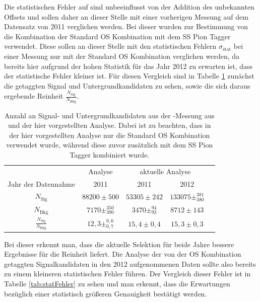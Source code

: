 Die statistischen Fehler auf \dmd sind unbeeinflusst von der Addition des unbekannten Offsets und sollen daher an dieser Stelle mit einer vorherigen Messung  auf dem Datensatz von \num{2011} \cite{dmd_messung} verglichen werden. Bei dieser wurden zur Bestimmung von \dmd die Kombination der Standard OS Kombination mit dem SS Pion Tagger verwendet. Diese sollen an dieser Stelle mit den statistischen Fehlern $\sigma_\text{stat}$ bei einer Messung nur mit der Standard OS Kombination verglichen werden, da bereits hier aufgrund der hohen Statistik für das Jahr \num{2012} zu erwarten ist, dass der statistische Fehler kleiner ist. Für diesen Vergleich sind in Tabelle \ref{tab:Reinheit} zunächst die getaggten Signal und Untergrundkandidaten zu sehen, sowie die sich daraus ergebende Reinheit $\frac{N_\text{Sig}}{N_\text{Bkg}}$.
\begin{table}[htbp]
	\centering
	\caption{Anzahl an Signal- und Untergrundkandidaten aus der \dmd-Messung aus \cite{dmd_messung} und der hier vorgestellten Analyse. Dabei ist zu beachten, dass in der hier vorgestellten Analyse nur die Standard OS Kombination verwendet wurde, während diese zuvor zusätzlich mit dem SS Pion Tagger kombiniert wurde.}
	\label{tab:Reinheit}
	\begin{tabular}{ccccc}
	\toprule
         			&\lhcb Analyse & \multicolumn{2}{c}{aktuelle Analyse} \\  
        Jahr der Datennahme & \num{2011}	 & \num{2011} & \num{2012} \\ 
        \midrule
       $N_\text{Sig}$	& $88200\pm500$ & $53305\pm242$ & $133075\pm^{381}_{380}$ \\ 
       $N_\text{Bkg}$	& $7170\pm^{350}_{390}$& $3470\pm^{94}_{93}$ & $8712\pm143$ \\ 
       \midrule
       $\frac{N_\text{Sig}}{N_\text{Bkg}}$ & $12{,}3\pm^{0{,}6}_{0{,}7}$ & $15{,}4\pm0{,}4$ & $15{,}3\pm0{,}3$  \\ 
       \bottomrule
	\end{tabular}
\end{table}
Bei dieser erkennt man, dass die aktuelle Selektion für beide Jahre bessere Ergebnisse für die Reinheit liefert. Die Analyse der von der OS Kombination getaggten Signalkandidaten in den \num{2012} aufgenommenen Daten sollte also bereits zu einem kleineren statistischen Fehler führen. Der Vergleich dieser Fehler ist in Tabelle \ref{tab:statFehler} zu sehen und man erkennt, dass die Erwartungen bezüglich einer statistisch größeren Genauigkeit bestätigt werden.
